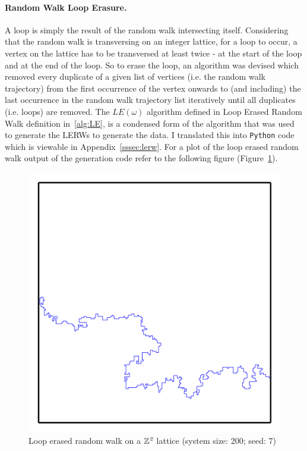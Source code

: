 \documentclass{article}
\begin{document}
\paragraph{Random Walk Loop Erasure.} A loop is simply the result of the random walk intersecting itself. Considering that the random walk is transversing on an integer lattice, for a loop to occur, a vertex on the lattice has to be transversed at least twice - at the start of the loop and at the end of the loop. So to erase the loop, an algorithm was devised which removed every duplicate of a given list of vertices (i.e. the random walk trajectory) from the first occurrence of the vertex onwards to (and including) the last occurrence in the random walk trajectory list iteratively until all duplicates (i.e. loops) are removed. The $LE(\omega)$ algorithm defined in Loop Erased Random Walk definition in~\ref{alg:LE}, is a condensed form of the algorithm that was used to generate the LERWs to generate the data.
I translated this into \texttt{Python} code which is viewable in Appendix~\ref{sssec:lerw}. For a plot of the loop erased random walk output of the generation code refer to the following figure (Figure~\ref{fig:LERW}).
\begin{figure}
	\begin{center}
		\includegraphics[scale=1.6]{LERW_200s7hdpi}
		\caption{Loop erased random walk on a $\mathbb{Z}^{\emph{2}}$ lattice (system size: 200; seed: 7)}
		\label{fig:LERW}
	\end{center}
\end{figure}
\newpage
\end{document}
